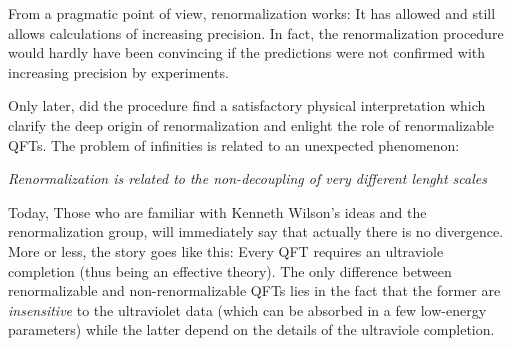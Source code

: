 From a pragmatic point of view, 
renormalization works: It 
has allowed and still allows calculations of increasing precision.
In fact, the renormalization procedure would hardly have been convincing if the
predictions were not confirmed with increasing precision by experiments.

Only later, did the procedure find a satisfactory physical interpretation which
clarify the deep origin of renormalization and enlight the role of
renormalizable QFTs.
   The problem of infinities is related to an unexpected phenomenon:
\begin{approfondimento}
   \emph{Renormalization is related to the non-decoupling of very different
      lenght scales}
\end{approfondimento}
Today, Those who are familiar with Kenneth Wilson's ideas and the renormalization
group, will immediately say that actually there is no divergence.
More or less, the story goes like this: 
Every QFT requires an ultraviole completion (thus being an effective theory).
The only difference between renormalizable and non-renormalizable QFTs lies in
the fact that the former are \emph{insensitive} to the ultraviolet data (which
can be absorbed in a few low-energy parameters) while the latter depend on the
details of the ultraviole completion.



 
